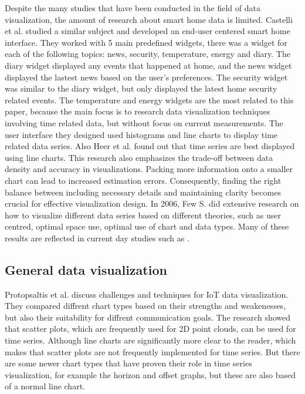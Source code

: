 \documentclass[journal]{IEEEtran}
\begin{document}
Despite the many studies that have been conducted in the field of data visualization, the amount of research about smart home data is limited. Castelli et al. \cite{CastelliWhatVisualization} studied a similar subject and developed an end-user centered smart home interface. They worked with 5 main predefined widgets, there was a widget for each of the following topics: news, security, temperature, energy and diary. The diary widget displayed any events that happened at home, and the news widget displayed the lastest news based on the user's preferences. The security widget was similar to the diary widget, but only displayed the latest home security related events. The temperature and energy widgets are the most related to this paper, because the main focus is to research data visualization techniques involving time related data, but without focus on current measurements. The user interface they designed used histograms and line charts to display time related data series. Also Heer et al. \cite{Heer2009SizingVisualizations} found out that time series are best displayed using line charts. This research also  emphasizes the trade-off between data density and accuracy in visualizations. Packing more information onto a smaller chart can lead to increased estimation errors. Consequently, finding the right balance between including necessary details and maintaining clarity becomes crucial for effective visualization design. In 2006, Few S. did extensive research \cite{StephenFew2006InformationDesign} on how to visualize different data series based on different theories, such as user centred, optimal space use, optimal use of chart and data types. Many of these results are reflected in current day studies such as \cite{Heer2009SizingVisualizations, CastelliWhatVisualization}.

\subsection{General data visualization}

Protopsaltis et al. \cite{Protopsaltis2020DataChallenges} discuss challenges and techniques for IoT data visualization. They compared diffrent chart types based on their strengths and weakenesses, but also their suitability for diffrent communication goals. The research showed that scatter plots, which are frequently used for 2D point clouds, can be used for time series. Although line charts are significantly more clear to the reader, which makes that scatter plots are not frequently implemented for time series. But there are some newer chart types that have proven their role in time series visualization, for example the horizon and offset graphs, but these are also based of a normal line chart. 
\end{document}
